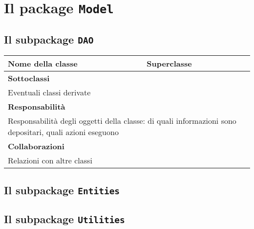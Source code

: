 \section{Il package \texttt{Model}}
\subsection{Il subpackage \texttt{DAO}}
\begin{table}[h!]
\begin{tabular}{|l|l|}
\hline
\textbf{Nome della classe} & \textbf{Superclasse} \\ \hline
\multicolumn{2}{|l|}{\textbf{Sottoclassi}}\\
\multicolumn{2}{|l|}{Eventuali classi derivate} \\ \hline
\multicolumn{2}{|l|}{\textbf{Responsabilità}}\\
\multicolumn{2}{|l|}{Responsabilità degli oggetti della classe: di quali informazioni sono depositari, quali azioni eseguono} \\ \hline
\multicolumn{2}{|l|}{\textbf{Collaborazioni}}\\
\multicolumn{2}{|l|}{Relazioni con altre classi} \\ \hline
\end{tabular}
\end{table}
\subsection{Il subpackage \texttt{Entities}}
\subsection{Il subpackage \texttt{Utilities}}